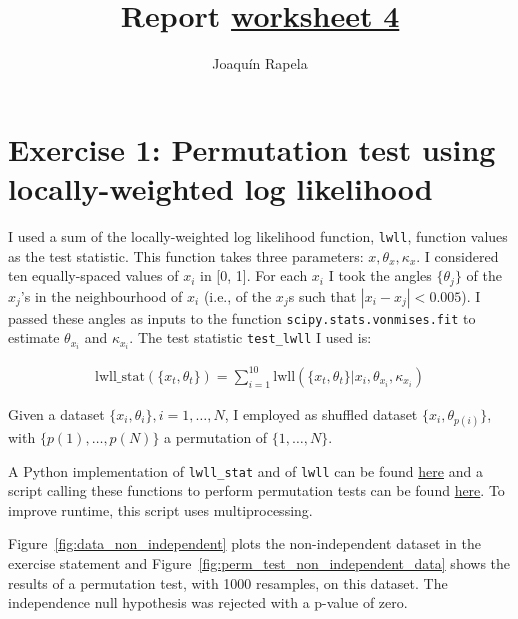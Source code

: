 \documentclass[12pt]{article}
\title{Report
\href{https://drive.google.com/file/d/1G_jnXZlwKmn1LTYGPTlSvHOrYSm5Q5p8/view?usp=share_link}{worksheet 4}}
\author{Joaqu\'{i}n Rapela}
\begin{document}
\maketitle

\section*{Exercise 1: Permutation test using locally-weighted log likelihood}

I used a sum of the locally-weighted log likelihood function, \texttt{lwll},
function values as the test statistic. This function takes three parameters:
$x, \theta_x, \kappa_x$. I considered ten equally-spaced values of $x_i$ in [0,
1]. For each $x_i$ I took the angles $\{\theta_j\}$ of the $x_j$'s in the
neighbourhood of $x_i$ (i.e., of the $x_j$s such that $|x_i-x_j|<0.005$). I
passed these angles as inputs to the function \texttt{scipy.stats.vonmises.fit}
to estimate $\theta_{x_i}$ and $\kappa_{x_i}$. The test statistic
\texttt{test\_lwll} I used is:

\begin{align}
    \text{lwll\_stat}(\{x_t,\theta_t\})=\sum_{i=1}^{10}\text{lwll}\left(\{x_t,\theta_t\}|x_i,\theta_{x_i},\kappa_{x_i}\right)
\end{align}

Given a dataset $\{x_i, \theta_i\}, i=1,\ldots,N$, I employed as shuffled dataset
$\{x_i, \theta_{p(i)}\}$, with $\{p(1),\ldots,p(N)\}$ a permutation of
$\{1,\ldots,N\}$.

A Python implementation of \texttt{lwll\_stat} and of \texttt{lwll} can be
found
\href{https://github.com/joacorapela/neuroinformatics23/blob/master/worksheets/ws4/mySolution/code/scripts/utils.py}{here}
and a script calling these functions to perform permutation tests can be found
\href{https://github.com/joacorapela/neuroinformatics23/blob/master/worksheets/ws4/mySolution/code/scripts/doPermutationTestLWLL.py}{here}.
To improve runtime, this script uses multiprocessing.

Figure~\ref{fig:data_non_independent} plots the non-independent 
dataset in the exercise statement and
Figure~\ref{fig:perm_test_non_independent_data} shows the results of a
permutation test, with 1000 resamples, on this dataset. The independence null
hypothesis was rejected with a p-value of zero.
\end{document}
